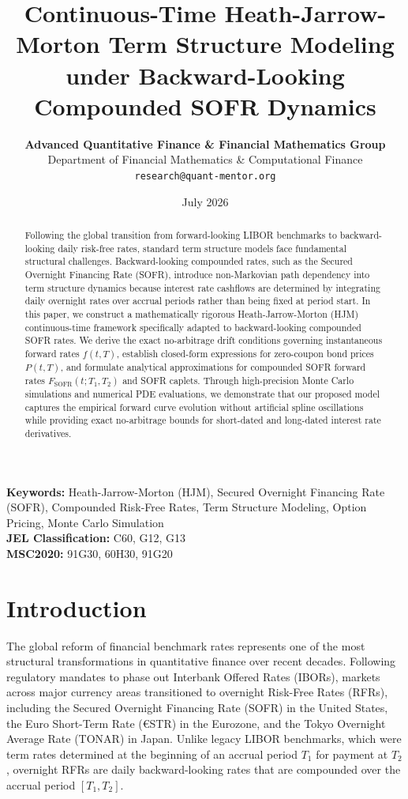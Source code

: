 \documentclass[11pt,a4paper]{article}
\title{\textbf{Continuous-Time Heath-Jarrow-Morton Term Structure Modeling under Backward-Looking Compounded SOFR Dynamics}}
\author{
  \textbf{Advanced Quantitative Finance \& Financial Mathematics Group}\\
  \small Department of Financial Mathematics \& Computational Finance\\
  \small \texttt{research@quant-mentor.org}
}
\date{July 2026}
\begin{document}
\maketitle

\begin{abstract}
Following the global transition from forward-looking LIBOR benchmarks to backward-looking daily risk-free rates, standard term structure models face fundamental structural challenges. Backward-looking compounded rates, such as the Secured Overnight Financing Rate (SOFR), introduce non-Markovian path dependency into term structure dynamics because interest rate cashflows are determined by integrating daily overnight rates over accrual periods rather than being fixed at period start. In this paper, we construct a mathematically rigorous Heath-Jarrow-Morton (HJM) continuous-time framework specifically adapted to backward-looking compounded SOFR rates. We derive the exact no-arbitrage drift conditions governing instantaneous forward rates $f(t, T)$, establish closed-form expressions for zero-coupon bond prices $P(t, T)$, and formulate analytical approximations for compounded SOFR forward rates $F_{\text{SOFR}}(t; T_1, T_2)$ and SOFR caplets. Through high-precision Monte Carlo simulations and numerical PDE evaluations, we demonstrate that our proposed model captures the empirical forward curve evolution without artificial spline oscillations while providing exact no-arbitrage bounds for short-dated and long-dated interest rate derivatives.
\end{abstract}

\noindent\textbf{Keywords:} Heath-Jarrow-Morton (HJM), Secured Overnight Financing Rate (SOFR), Compounded Risk-Free Rates, Term Structure Modeling, Option Pricing, Monte Carlo Simulation\\
\noindent\textbf{JEL Classification:} C60, G12, G13\\
\noindent\textbf{MSC2020:} 91G30, 60H30, 91G20

\section{Introduction}

The global reform of financial benchmark rates represents one of the most structural transformations in quantitative finance over recent decades. Following regulatory mandates to phase out Interbank Offered Rates (IBORs), markets across major currency areas transitioned to overnight Risk-Free Rates (RFRs), including the Secured Overnight Financing Rate (SOFR) in the United States, the Euro Short-Term Rate (€STR) in the Eurozone, and the Tokyo Overnight Average Rate (TONAR) in Japan. Unlike legacy LIBOR benchmarks, which were term rates determined at the beginning of an accrual period $T_1$ for payment at $T_2$, overnight RFRs are daily backward-looking rates that are compounded over the accrual period $[T_1, T_2]$.
\end{document}
